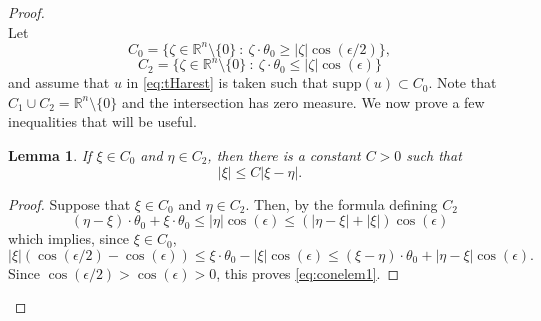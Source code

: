 \documentclass[a4paper,12pt]{amsart}
\numberwithin{equation}{section}
\theoremstyle{plain}
\numberwithin{theorem}{section}
\newtheorem{lemma}[theorem]{Lemma}
\theoremstyle{definition}
\theoremstyle{remark}
\theoremstyle{remark}
\theoremstyle{remark}
\begin{document}
\begin{proof}
\[    \]
    Let
    \[
    C_0 = \{\zeta \in \mathbb{R}^n \setminus \{0\} \ : \ \zeta \cdot \theta_0 \geq |\zeta| \cos(\epsilon/2) \},
    \]
    \[
    C_2 = \{\zeta \in \mathbb{R}^n \setminus \{0\} \ : \ \zeta \cdot \theta_0 \leq |\zeta| \cos(\epsilon) \}
    \]
    and assume that $u$ in \eqref{eq:tHarest} is taken such that $\mathrm{supp}(u) \subset C_0$. Note that $C_1 \cup C_2 = \mathbb{R}^n \setminus \{0\}$ and the intersection has zero measure. We now prove a few inequalities that will be useful.
    \begin{lemma} \label{lem:conelem}
    If $\xi \in C_0$ and $\eta \in C_2$, then there is a constant $C>0$ such that
    \begin{equation} \label{eq:conelem1}
    |\xi| \leq C |\xi - \eta|.
    \end{equation}
    \end{lemma}
    \begin{proof}
        Suppose that  $\xi \in C_0$ and $\eta \in C_2$. Then, by the formula defining $C_2$
        \[
        (\eta -\xi) \cdot \theta_0 + \xi \cdot \theta_0 \leq |\eta| \cos(\epsilon) \leq (|\eta - \xi| + |\xi|) \cos(\epsilon)
        \]
        which implies, since $\xi \in C_0$,
        \[
        |\xi| (\cos(\epsilon/2) - \cos(\epsilon)) \leq \xi \cdot \theta_0 - |\xi| \cos(\epsilon) \leq (\xi-\eta)\cdot \theta_0 + |\eta - \xi| \cos(\epsilon).
        \]
        Since $\cos(\epsilon/2)>\cos(\epsilon)>0$, this proves \eqref{eq:conelem1}.%

    \end{proof}


\end{proof}
\end{document}

